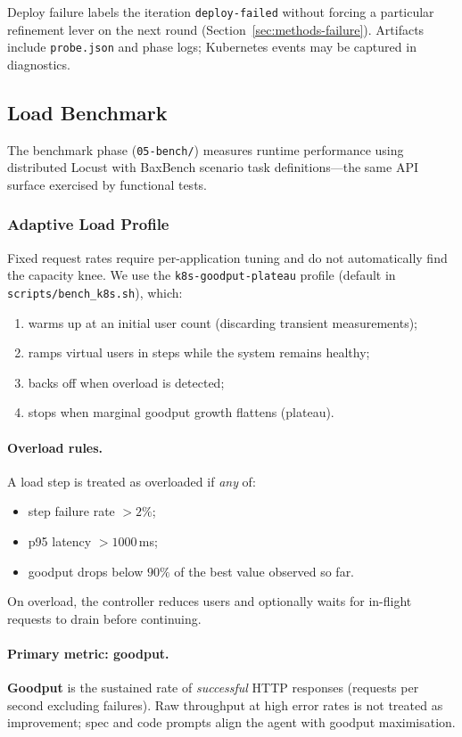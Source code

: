 Deploy failure labels the iteration \texttt{deploy-failed} without forcing a
particular refinement lever on the next round (Section~\ref{sec:methods-failure}).
Artifacts include \texttt{probe.json} and phase logs; Kubernetes events may be
captured in diagnostics.


\subsection{Load Benchmark}
\label{sec:methods-bench}

The benchmark phase (\texttt{05-bench/}) measures runtime performance using
distributed Locust with BaxBench scenario task definitions---the same API
surface exercised by functional tests.

\subsubsection{Adaptive Load Profile}

Fixed request rates require per-application tuning and do not automatically
find the capacity knee.  We use the \texttt{k8s-goodput-plateau} profile
(default in \texttt{scripts/bench\_k8s.sh}), which:
\begin{enumerate}
  \item warms up at an initial user count (discarding transient measurements);
  \item ramps virtual users in steps while the system remains healthy;
  \item backs off when overload is detected;
  \item stops when marginal goodput growth flattens (plateau).
\end{enumerate}

\paragraph{Overload rules.}
A load step is treated as overloaded if \emph{any} of:
\begin{itemize}
  \item step failure rate $> 2\%$;
  \item p95 latency $> 1000$\,ms;
  \item goodput drops below $90\%$ of the best value observed so far.
\end{itemize}
On overload, the controller reduces users and optionally waits for in-flight
requests to drain before continuing.

\paragraph{Primary metric: goodput.}
\textbf{Goodput} is the sustained rate of \emph{successful} HTTP responses
(requests per second excluding failures).  Raw throughput at high error rates
is not treated as improvement; spec and code prompts align the agent with
goodput maximisation.

